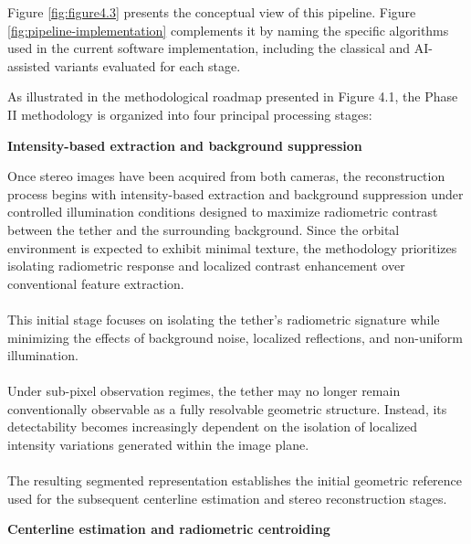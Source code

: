 Figure \ref{fig:figure4.3} presents the conceptual view of this pipeline. Figure \ref{fig:pipeline-implementation} complements it by naming the specific algorithms used in the current software implementation, including the classical and AI-assisted variants evaluated for each stage.



As illustrated in the methodological roadmap presented in Figure 4.1, the Phase II methodology is organized into four principal processing stages:

\vspace{0.5cm}
\noindent \textbf{Intensity-based extraction and background suppression}
\vspace{0.2cm}

Once stereo images have been acquired from both cameras, the reconstruction process begins with intensity-based extraction and background suppression under controlled illumination conditions designed to maximize radiometric contrast between the tether and the surrounding background. Since the orbital environment is expected to exhibit minimal texture, the methodology prioritizes isolating radiometric response and localized contrast enhancement over conventional feature extraction.
\\\\
This initial stage focuses on isolating the tether's radiometric signature while minimizing the effects of background noise, localized reflections, and non-uniform illumination.
\\\\
Under sub-pixel observation regimes, the tether may no longer remain conventionally observable as a fully resolvable geometric structure. Instead, its detectability becomes increasingly dependent on the isolation of localized intensity variations generated within the image plane.
\\\\
The resulting segmented representation establishes the initial geometric reference used for the subsequent centerline estimation and stereo reconstruction stages.

\noindent \textbf{Centerline estimation and radiometric centroiding}
\vspace{0.2cm}

